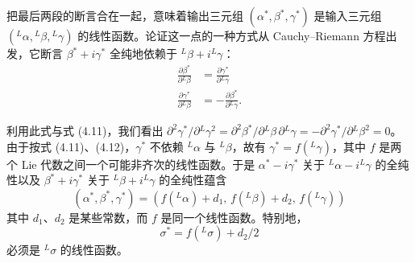 把最后两段的断言合在一起，意味着输出三元组 $(\alpha^*,\beta^*,\gamma^*)$ 是输入三元组 $({}^L\alpha,{}^L\beta,{}^L\gamma)$ 的线性函数。论证这一点的一种方式从 Cauchy--Riemann 方程出发，它断言 $\beta^*+i\gamma^*$ 全纯地依赖于
${}^L\beta+i{}^L\gamma$：
\begin{equation}\tag{4.13}
\begin{aligned}
\frac{\partial\beta^*}{\partial{}^L\beta}&=\frac{\partial\gamma^*}{\partial{}^L\gamma}\\
\frac{\partial\gamma^*}{\partial{}^L\beta}&=-\frac{\partial\beta^*}{\partial{}^L\gamma}.
\end{aligned}
\end{equation}

利用此式与式 (4.11)，我们看出 $\partial^2\gamma^*/\partial{}^L\gamma^2=\partial^2\beta^*/\partial{}^L\beta\,\partial{}^L\gamma=-\partial^2\gamma^*/\partial{}^L\beta^2=0$。由于按式 (4.11)、(4.12)，$\gamma^*$ 不依赖 ${}^L\alpha$ 与 ${}^L\beta$，故有 $\gamma^*=f({}^L\gamma)$，其中 $f$ 是两个 Lie 代数之间一个可能非齐次的线性函数。于是 $\alpha^*-i\gamma^*$ 关于 ${}^L\alpha-i{}^L\gamma$ 的全纯性以及 $\beta^*+i\gamma^*$ 关于 ${}^L\beta+i{}^L\gamma$ 的全纯性蕴含
\begin{equation}\tag{4.14}
(\alpha^*,\beta^*,\gamma^*)=(f({}^L\alpha)+d_1,\,f({}^L\beta)+d_2,\,f({}^L\gamma))
\end{equation}
其中 $d_1$、$d_2$ 是某些常数，而 $f$ 是同一个线性函数。特别地，
\begin{equation}\tag{4.15}
\sigma^*=f({}^L\sigma)+d_2/2
\end{equation}
必须是 ${}^L\sigma$ 的线性函数。


